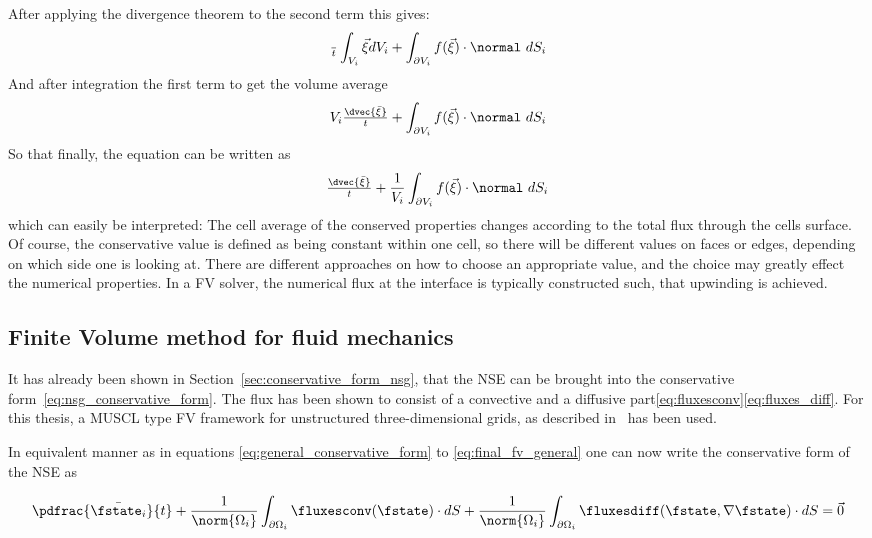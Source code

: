 \documentclass[../main.tex]{subfiles}
\begin{document}
After applying the divergence theorem to the second term this gives:
\begin{align}
\tfrac{~}{t}\int_{V_i} \vec{\xi} dV_i + \int_{\partial V_i} f(\vec{\xi})\cdot\normal~dS_i
\end{align}
And after integration the first term to get the volume average
\begin{align}
V_i \tfrac{\dvec{\bar{\xi}}}{t} + \int_{\partial V_i} f(\vec{\xi})\cdot\normal~dS_i
\end{align}
So that finally, the equation can be written as
\begin{align}\label{eq:final_fv_general}
\tfrac{\dvec{\bar{\xi}}}{t} + \frac{1}{V_i} \int_{\partial V_i} f(\vec{\xi})\cdot\normal~dS_i
\end{align}
which can easily be interpreted: The cell average of the conserved properties changes according to the total flux through the cells surface.
Of course, the conservative value is defined as being constant within one cell, so there will be different values on faces or edges, depending on which side one is looking at. There are different approaches on how to choose an appropriate value, and the choice may greatly effect the numerical properties. In a \ac{FV} solver, the numerical flux at the interface is typically constructed such, that upwinding is achieved.

\subsection{Finite Volume method for fluid mechanics}\label{sec:fv_fluid_mechanics}
It has already been shown in Section~\ref{sec:conservative_form_nsg}, that the \ac{NSE} can be brought into the conservative form~\eqref{eq:nsg_conservative_form}. The flux has been shown to consist of a convective and a diffusive part\eqref{eq:fluxesconv}\eqref{eq:fluxes_diff}.
For this thesis, a \ac{MUSCL} type \ac{FV} framework for unstructured three-dimensional grids, as described in~\cite{Main2014} has been used.



In equivalent manner as in equations \eqref{eq:general_conservative_form} to \eqref{eq:final_fv_general} one can now write the conservative form of the \ac{NSE} as

\begin{align}\label{eq:NSE_full_FV formulation}
\pdfrac{\bar{\fstate_i}}{t} +
\frac{1}{\norm{\Omega_i}} \int_{\partial\Omega_i} \fluxesconv(\fstate)\cdot dS +
\frac{1}{\norm{\Omega_i}} \int_{\partial\Omega_i} \fluxesdiff(\fstate,\nabla \fstate)\cdot dS =
\vec{0}
\end{align}
\end{document}
